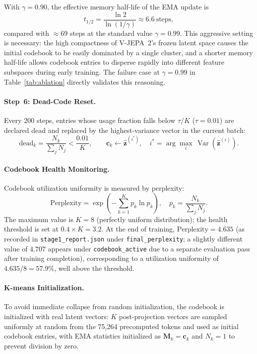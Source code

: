 \documentclass{article}
\begin{document}
With $\gamma = 0.90$, the effective memory half-life of the EMA update is
%
\begin{equation}
  t_{1/2} = \frac{\ln 2}{\ln(1/\gamma)} \approx 6.6\ \text{steps},
\end{equation}
%
compared with $\approx\!69$ steps at the standard value $\gamma = 0.99$.  This
aggressive setting is necessary: the high compactness of V-JEPA~2's frozen
latent space causes the initial codebook to be easily dominated by a single
cluster, and a shorter memory half-life allows codebook entries to disperse
rapidly into different feature subspaces during early training.  The failure
case at $\gamma = 0.99$ in Table~\ref{tab:ablation} directly validates this
reasoning.

\paragraph{Step~6: Dead-Code Reset.}
Every 200 steps, entries whose usage fraction falls below $\tau/K$
($\tau = 0.01$) are declared dead and replaced by the highest-variance vector
in the current batch:
%
\begin{equation}
  \text{dead}_k
  = \frac{N_k}{\sum_j N_j} < \frac{0.01}{K},
  \qquad
  \mathbf{c}_k \leftarrow \hat{\mathbf{z}}^{(i^*)},
  \quad
  i^* = \arg\max_{i}\,\operatorname{Var}(\hat{\mathbf{z}}^{(i)}).
\end{equation}

\paragraph{Codebook Health Monitoring.}
Codebook utilization uniformity is measured by perplexity:
%
\begin{equation}
  \text{Perplexity}
  = \exp\!\left(-\sum_{k=1}^{K} p_k \ln p_k\right),
  \quad p_k = \frac{N_k}{\sum_j N_j}.
\end{equation}
%
The maximum value is $K = 8$ (perfectly uniform distribution); the health
threshold is set at $0.4 \times K = 3.2$.  At the end of training, $\text{Perplexity} = 4.635$
(as recorded in \texttt{stage1\_report.json} under
\texttt{final\_perplexity}; a slightly different value of $4.707$
appears under \texttt{codebook\_active} due to a separate
evaluation pass after training completion), corresponding to a utilization uniformity of
$4.635/8 = 57.9\%$, well above the threshold.


\paragraph{K-means Initialization.}
To avoid immediate collapse from random initialization, the codebook is
initialized with real latent vectors: $K$ post-projection vectors are sampled
uniformly at random from the 75,264 precomputed tokens and used as initial
codebook entries, with EMA statistics initialized as $\mathbf{M}_k = \mathbf{c}_k$
and $N_k = 1$ to prevent division by zero.
\end{document}
